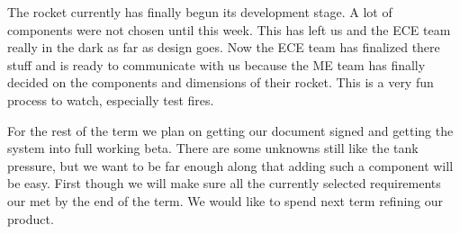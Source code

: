 \documentclass[10pt,draftclsnofoot,onecolumn]{IEEEtran}
\begin{document}
The rocket currently has finally begun its development stage. A lot of components were not chosen until this week. This has left us and the ECE team really in the dark as far as design goes. Now the ECE team has finalized there stuff and is ready to communicate with us because the ME team has finally decided on the components and dimensions of their rocket. This is a very fun process to watch, especially test fires. \par
For the rest of the term we plan on getting our document signed and getting the system into full working beta. There are some unknowns still like the tank pressure, but we want to be far enough along that adding such a component will be easy. First though we will make sure all the currently selected requirements our met by the end of the term. We would like to spend next term refining our product. \par
\end{document}
